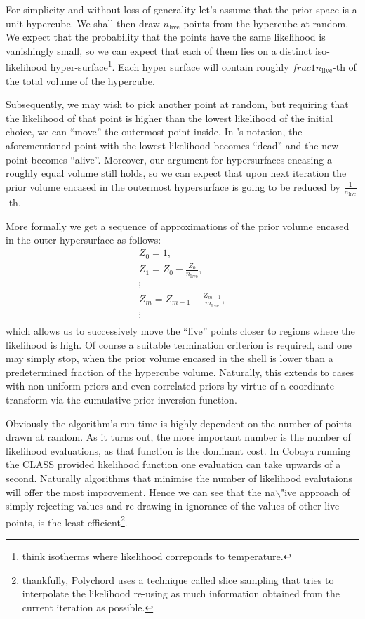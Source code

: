 \documentclass[usenatbib]{mnras}
\begin{document}
For simplicity and without loss of generality let's assume that the
prior space is a unit hypercube.  We shall then draw
\(n_\text{live}\) points from the hypercube at random. We expect
that the probability that the points have the same likelihood is
vanishingly small, so we can expect that each of them lies on a
distinct iso-likelihood hyper-surface\footnote{think isotherms  where likelihood correponds to temperature.}. Each hyper surface
will contain roughly \(frac{1}{n_\text{live}}\)-th of the total
volume of the hypercube.

Subsequently, we may wish to pick another point at random, but
requiring that the likelihood of that point is higher than the
lowest likelihood of the initial choice, we can ``move'' the
outermost point inside. In \citeauthor{skilling2006} 's notation, the
aforementioned point with the lowest likelihood becomes ``dead''
and the new point becomes ``alive''. Moreover, our argument for
hypersurfaces encasing a roughly equal volume still holds, so we
can expect that upon next iteration the prior volume encased in the
outermost hypersurface is going to be reduced by \(\frac{1}{n_\text{live}}\)-th. 

More formally we get a sequence of approximations of the prior
volume encased in the outer hypersurface as follows:
\begin{eqnarray}
  Z_{0} = 1,\\
  Z_{1} = Z_{0} - \frac{Z_{0}}{n_\text{live}},\\
  \vdots\\
  Z_{m} = Z_{m-1} - \frac{Z_{m-1}}{m_\text{live}},\\
  \vdots\\
\end{eqnarray}
which allows us to successively move the ``live'' points closer to
regions where the likelihood is high. Of course a suitable
termination criterion is required, and one may simply stop, when
the prior volume encased in the shell is lower than a predetermined
fraction of the hypercube volume. Naturally, this extends to cases
with non-uniform priors and even correlated priors by virtue of a
coordinate transform via the cumulative prior inversion function.

Obviously the algorithm's run-time is highly dependent on the
number of points drawn at random. As it turns out, the more
important number is the number of likelihood evaluations, as that
function is the dominant cost. In Cobaya running the CLASS provided
likelihood function one evaluation can take upwards of a
second. Naturally algorithms that minimise the number of likelihood
evalutaions will offer the most improvement. Hence we can see that
the na$\backslash$"ive approach of simply rejecting values and re-drawing in
ignorance of the values of other live points, is the least
efficient\footnote{thankfully, Polychord uses a technique called slice   sampling that tries to interpolate the likelihood re-using as much  information obtained from the current iteration as possible.}.
\end{document}

